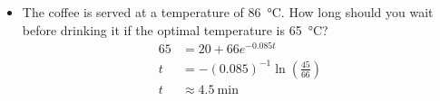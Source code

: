 \begin{itemize}
\begin{itemize}
      \item The coffee is served at a temperature of \SI{86}{\celsius}. How
        long should you wait before drinking it if the optimal temperature is
        \SI{65}{\celsius}?
        \begin{align*}
          65 &= 20 + 66e^{-0.085t} \\
          t &= -\left( 0.085 \right)^{-1} \ln \left( \frac{45}{66} \right) \\
          t &\approx 4.5 ~\text{min}
        \end{align*}
    \end{itemize}
\end{itemize}
